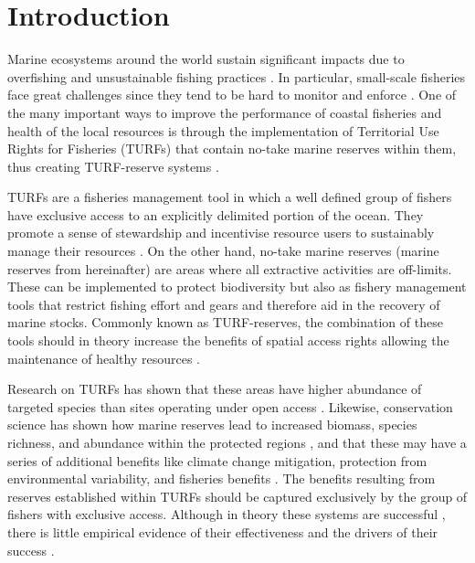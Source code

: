\documentclass{frontiersSCNS}
\begin{document}
\hypertarget{introduction}{%
\section{Introduction}\label{introduction}}

Marine ecosystems around the world sustain significant impacts due to
overfishing and unsustainable fishing practices
\citep{halpern_2008-dK,worm_2006-IB,pauly_2005-qV}. In particular,
small-scale fisheries face great challenges since they tend to be hard
to monitor and enforce \citep{costello_2012}. One of the many important
ways to improve the performance of coastal fisheries and health of the
local resources is through the implementation of Territorial Use Rights
for Fisheries (TURFs) that contain no-take marine reserves within them,
thus creating TURF-reserve systems
\citep{costello_2010,afflerbach_2014,lester_2017}.

TURFs are a fisheries management tool in which a well defined group of
fishers have exclusive access to an explicitly delimited portion of the
ocean. They promote a sense of stewardship and incentivise resource
users to sustainably manage their resources
\citep{gelcich_2008,mccay_2017}. On the other hand, no-take marine
reserves (marine reserves from hereinafter) are areas where all
extractive activities are off-limits. These can be implemented to
protect biodiversity but also as fishery management tools that restrict
fishing effort and gears and therefore aid in the recovery of marine
stocks. Commonly known as TURF-reserves, the combination of these tools
should in theory increase the benefits of spatial access rights allowing
the maintenance of healthy resources
\citep{afflerbach_2014,lester_2017}.

Research on TURFs has shown that these areas have higher abundance of
targeted species than sites operating under open access
\citep{gelcich_2008,mccay_2014,mccay_2017}. Likewise, conservation
science has shown how marine reserves lead to increased biomass, species
richness, and abundance within the protected regions
\citep{lester_2009-Ks,giakoumi_2017-V2,sala_2017-69}, and that these may
have a series of additional benefits like climate change mitigation,
protection from environmental variability, and fisheries benefits
\cite{roberts_2017-J9,micheli_2012-EU,krueck_2017-J1}. The benefits
resulting from reserves established within TURFs should be captured
exclusively by the group of fishers with exclusive access. Although in
theory these systems are successful
\citep{costello_2010,smallhornwest_2018}, there is little empirical
evidence of their effectiveness and the drivers of their success
\citep{afflerbach_2014,lester_2017}.
\end{document}
